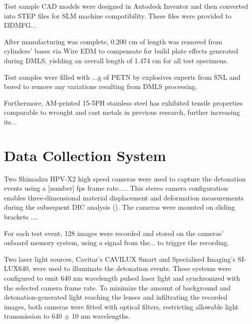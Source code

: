 Test sample \gls{CAD} models were designed in Autodesk Inventor and then converted into STEP files for \gls{SLM} machine compatibility. These files were provided to I3DMFG...

After manufacturing was complete, 0.200 cm of length was removed from cylinders' bases via Wire \gls{EDM} to compensate for build plate effects generated during \gls{DMLS}, yielding an overall length of 1.474 cm for all test specimens. 

Test samples were filled with ...g of \gls{PETN} by explosives experts from \gls{SNL} and bored to remove any variations resulting from \gls{DMLS} processing.

Furthermore, \gls{AM}-printed 15-5PH stainless steel has exhibited tensile properties comparable to wrought and cast metals in previous research, further increasing its... 




\section{Data Collection System} \label{sec:3_specimen}

Two Shimadzu HPV-X2 high speed cameras were used to capture the detonation events using a [number] \gls{fps} frame rate..... This stereo camera configuration enables three-dimensional material displacement and deformation measurements during the subsequent \gls{DIC} analysis ().  The cameras were mounted on sliding brackets .... 

For each test event, 128 images were recorded and stored on the cameras' onboard memory system, using a signal from the... to trigger the recording.


Two laser light sources, Cavitar's CAVILUX Smart and Specialised Imaging's SI-LUX640, were used to illuminate the detonation events. These systems were configured to emit 640 nm wavelength pulsed laser light and synchronized with the selected camera frame rate. To minimize the amount of background and detonation-generated light reaching the lenses and infiltrating the recorded images, both cameras were fitted with optical filters, restricting allowable light transmission to 640 $\pm$ 10 nm wavelengths.  


